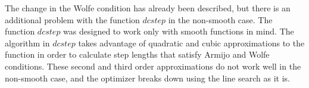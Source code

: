 





The change in the Wolfe condition has already been described, but there is an additional problem with the function $dcstep$ in the non-smooth case. The function $dcstep$ was designed to work only with smooth functions in mind. The algorithm in $dcstep$ takes advantage of quadratic and cubic approximations to the function in order to calculate step lengths that satisfy Armijo and Wolfe conditions. These second and third order approximations do not work well in the non-smooth case, and the optimizer breaks down using the line search as it is.

